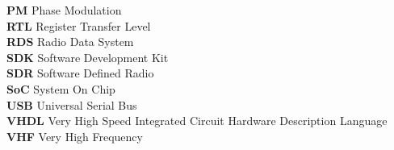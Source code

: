 \begin{tabbing}
\textbf{PM}        \> Phase Modulation\\
\textbf{RTL}       \> Register Transfer Level\\
\textbf{RDS}       \> Radio Data System\\
\textbf{SDK}       \> Software Development Kit\\
\textbf{SDR}       \> Software Defined Radio\\
\textbf{SoC}       \> System On Chip\\
\textbf{USB}       \> Universal Serial Bus\\
\textbf{VHDL}      \> Very High Speed Integrated Circuit Hardware Description Language\\
\textbf{VHF}       \> Very High Frequency\\

\end{tabbing}
